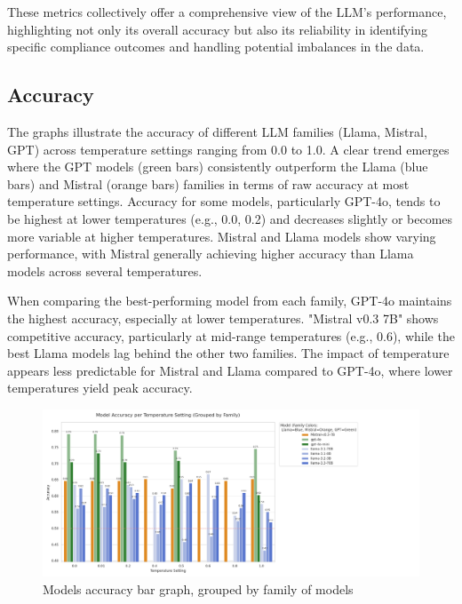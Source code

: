 \documentclass[../main.tex]{subfiles}
\begin{document}
These metrics collectively offer a comprehensive view of the LLM's performance, highlighting not only its overall accuracy but also its reliability in identifying specific compliance outcomes and handling potential imbalances in the data.


\subsection{Accuracy}
The graphs illustrate the accuracy  of different LLM families (Llama, Mistral, GPT) across temperature settings ranging from 0.0 to 1.0. A clear trend emerges where the GPT models (green bars) consistently outperform the Llama (blue bars) and Mistral (orange bars) families in terms of raw accuracy at most temperature settings. Accuracy for some models, particularly GPT-4o, tends to be highest at lower temperatures (e.g., 0.0, 0.2) and decreases slightly or becomes more variable at higher temperatures. Mistral and Llama models show varying performance, with Mistral generally achieving higher accuracy than Llama models across several temperatures.

When comparing the best-performing model from each family, GPT-4o maintains the highest accuracy, especially at lower temperatures. "Mistral v0.3 7B" shows competitive accuracy, particularly at mid-range temperatures (e.g., 0.6), while the best Llama models lag behind the other two families. The impact of temperature appears less predictable for Mistral and Llama compared to GPT-4o, where lower temperatures yield peak accuracy.

\begin{figure}[H]
    \caption{Models accuracy bar graph, grouped by family of models}
    \label{fig:Accuracy}
    \includegraphics[width=\textwidth]{Graphs/Model Accuracy final.png}
\end{figure}
\end{document}
